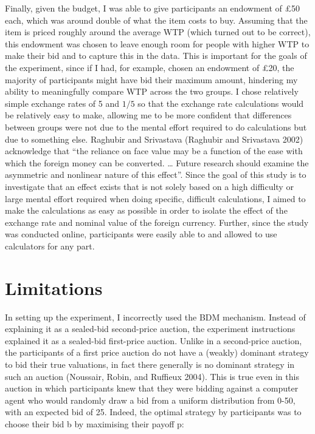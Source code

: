 \documentclass[
]{report}
\begin{document}
Finally, given the budget, I was able to give participants an endowment
of £50 each, which was around double of what the item costs to buy.
Assuming that the item is priced roughly around the average WTP (which
turned out to be correct), this endowment was chosen to leave enough
room for people with higher WTP to make their bid and to capture this in
the data. This is important for the goals of the experiment, since if I
had, for example, chosen an endowment of £20, the majority of
participants might have bid their maximum amount, hindering my ability
to meaningfully compare WTP across the two groups. I chose relatively
simple exchange rates of 5 and \(1/5\) so that the exchange rate
calculations would be relatively easy to make, allowing me to be more
confident that differences between groups were not due to the mental
effort required to do calculations but due to something else. Raghubir
and Srivastava (Raghubir and Srivastava 2002) acknowledge that ``the
reliance on face value may be a function of the ease with which the
foreign money can be converted. \ldots{} Future research should examine
the asymmetric and nonlinear nature of this effect''. Since the goal of
this study is to investigate that an effect exists that is not solely
based on a high difficulty or large mental effort required when doing
specific, difficult calculations, I aimed to make the calculations as
easy as possible in order to isolate the effect of the exchange rate and
nominal value of the foreign currency. Further, since the study was
conducted online, participants were easily able to and allowed to use
calculators for any part.

\section{Limitations}\label{limitations}

In setting up the experiment, I incorrectly used the BDM mechanism.
Instead of explaining it as a sealed-bid second-price auction, the
experiment instructions explained it as a sealed-bid first-price
auction. Unlike in a second-price auction, the participants of a first
price auction do not have a (weakly) dominant strategy to bid their true
valuations, in fact there generally is no dominant strategy in such an
auction (Noussair, Robin, and Ruffieux 2004). This is true even in this
auction in which participants knew that they were bidding against a
computer agent who would randomly draw a bid from a uniform distribution
from 0-50, with an expected bid of 25. Indeed, the optimal strategy by
participants was to choose their bid b by maximising their payoff p:
\end{document}
